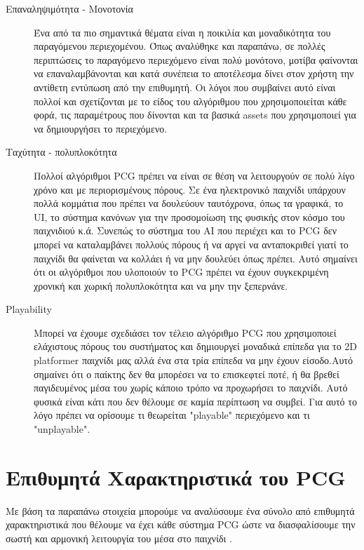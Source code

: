 \begin{description}
\item [Επαναληψιμότητα - Μονοτονία] Ένα από τα πιο σημαντικά θέματα είναι η ποικιλία και μοναδικότητα του παραγόμενου περιεχομένου. Όπως αναλύθηκε και παραπάνω, σε πολλές περιπτώσεις το παραγόμενο περιεχόμενο είναι πολύ μονότονο, μοτίβα φαίνονται να επαναλαμβάνονται και κατά συνέπεια το αποτέλεσμα δίνει στον χρήστη την αντίθετη εντύπωση από την επιθυμητή. Οι λόγοι που συμβαίνει αυτό είναι πολλοί και σχετίζονται με το είδος του αλγόριθμου που χρησιμοποιείται κάθε φορά, τις παραμέτρους που δίνονται και τα βασικά assets που χρησιμοποιεί για να δημιουργήσει το περιεχόμενο.

\item [Ταχύτητα - πολυπλοκότητα] Πολλοί αλγόριθμοι PCG πρέπει να είναι σε θέση να λειτουργούν σε πολύ λίγο χρόνο και με περιορισμένους πόρους. Σε ένα ηλεκτρονικό παιχνίδι υπάρχουν πολλά κομμάτια που πρέπει να δουλεύουν ταυτόχρονα, όπως τα γραφικά, το UI, το σύστημα κανόνων για την προσομοίωση της φυσικής στον κόσμο του παιχνιδιού κ.ά. Συνεπώς το σύστημα του AI που περιέχει και το PCG δεν μπορεί να καταλαμβάνει πολλούς πόρους ή να αργεί να ανταποκριθεί γιατί το παιχνίδι θα φαίνεται να κολλάει ή να μην δουλεύει όπως πρέπει. Αυτό σημαίνει ότι οι αλγόριθμοι που υλοποιούν το PCG πρέπει να έχουν συγκεκριμένη χρονική και χωρική πολυπλοκότητα και να μην την ξεπερνάνε.

\item [Playability] Μπορεί να έχουμε σχεδιάσει τον τέλειο αλγόριθμο PCG που χρησιμοποιεί ελάχιστους πόρους του συστήματος και δημιουργεί μοναδικά επίπεδα για το 2D platformer παιχνίδι μας αλλά ένα στα τρία επίπεδα να μην έχουν είσοδο.Αυτό σημαίνει ότι ο παίκτης δεν θα μπορέσει να το επισκεφτεί ποτέ, ή θα βρεθεί παγιδευμένος μέσα του χωρίς κάποιο τρόπο να προχωρήσει το παιχνίδι. Αυτό φυσικά είναι κάτι που δεν θέλουμε σε καμία περίπτωση να συμβεί. Για αυτό το λόγο πρέπει να ορίσουμε τι θεωρείται "playable" περιεχόμενο και τι "unplayable".
\end{description}


\section{Επιθυμητά Χαρακτηριστικά του PCG}
Με βάση τα παραπάνω στοιχεία μπορούμε να αναλύσουμε ένα σύνολο από επιθυμητά χαρακτηριστικά που θέλουμε να έχει κάθε σύστημα PCG ώστε να διασφαλίσουμε την σωστή και αρμονική λειτουργία του μέσα στο παιχνίδι \cite{challenges} \cite{desirableproperties}.


